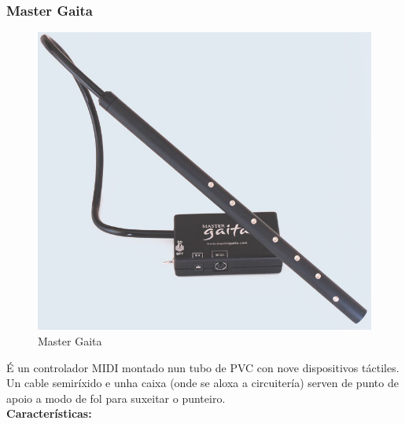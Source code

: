   \subsubsection{Master Gaita}

  \begin{figure}[htbp]
   \centering
   \includegraphics[scale=0.2,keepaspectratio=true]{./imagenes/master-gaita.jpg}
   \caption[Master Gaita]{Master Gaita \cite{MasterGaita}}
   \label{figura:MasterGaita}
  \end{figure}

  É un controlador MIDI montado nun tubo de PVC con nove dispositivos táctiles.
  Un cable semiríxido e unha caixa (onde se aloxa a circuitería) serven de
  punto de apoio a modo de fol para suxeitar o punteiro. \\

  \textbf{Características:}

